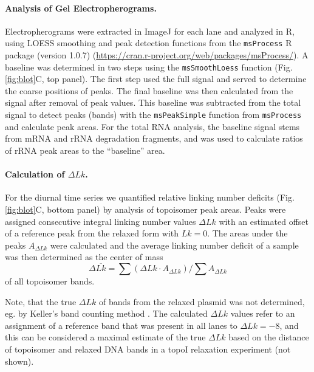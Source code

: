 \documentclass[10pt,a4]{article}
\def\cite#1{\hypersetup{citecolor=Teal}\citep{#1}} %
\begin{document}
\paragraph{Analysis of Gel Electropherograms.}
Electropherograms were extracted in ImageJ for each lane and analyzed
in R, using LOESS smoothing and peak detection functions from the
\texttt{msProcess} R package (version 1.0.7)
(\url{https://cran.r-project.org/web/packages/msProcess/}). A baseline
was determined in two steps using the \texttt{msSmoothLoess} function
(Fig. \ref{fig:blot}C, top panel).  The first step used the full
signal and served to determine the coarse positions of peaks.  The
final baseline was then calculated from the signal after removal of
peak values. This baseline was subtracted from the total signal to
detect peaks (bands) with the \texttt{msPeakSimple} function from
\texttt{msProcess} and calculate peak areas.  For the total RNA
analysis, the baseline signal stems from mRNA and rRNA degradation
fragments, and was used to calculate ratios of rRNA peak areas to the
``baseline'' area.

\paragraph{Calculation of $\Delta Lk$.}
For the diurnal time series we quantified relative linking number
deficits (Fig. \ref{fig:blot}C, bottom panel) by analysis of
topoisomer peak areas.  Peaks were assigned consecutive
integral linking number values $\Delta Lk$ with an estimated offset of
a reference peak from the relaxed form with $Lk=0$. The areas under
the peaks $A_{\Delta Lk}$ were calculated and the average linking
number deficit of a sample was then determined as the center of mass
\begin{equation}
  \label{eq:dlk}
  \Delta \overline{Lk} = \sum{(\Delta Lk \cdot
    A_{\Delta Lk})}/\sum{A_{\Delta Lk}}
\end{equation}
of all topoisomer bands.

Note, that the true $\Delta Lk$ of bands from the relaxed plasmid was
not determined, eg. by Keller's band counting method
\cite{Keller1975b}.  The calculated $\Delta Lk$ values refer to an
assignment of a reference band that was present in all lanes to
$\Delta Lk=-8$, and this can be considered a maximal estimate of the
true $\Delta Lk$ based on the distance of topoisomer and relaxed DNA
bands in a topoI relaxation experiment (not shown).

\setlength{\bibsep}{0.0pt}
\begin{spacing}{0.9}
  
\end{spacing}
\end{document}
